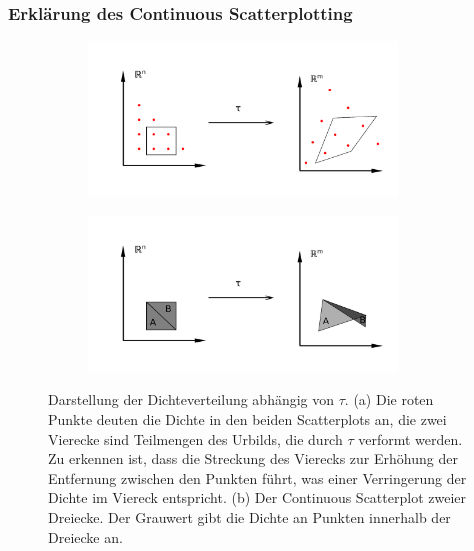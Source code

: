 \documentclass[a4paper,fontsize=12pt,toc=bib,parskip=half,ngerman]{scrartcl}
\begin{document}
\subsubsection{Erkl\"arung des Continuous Scatterplotting}
\begin{figure}
	\centering
	\begin{subfigure}{0.45\textwidth}
		\includegraphics[width=0.9\textwidth]{pictures/ContinuousScatterplot}
		\subcaption{}
	\end{subfigure}
	\begin{subfigure}{0.45\textwidth}
		\includegraphics[width=0.9\textwidth]{pictures/Case2}
		\subcaption{}
		\label{Case2}
	\end{subfigure}
	\caption{Darstellung der Dichteverteilung abh\"angig von $\tau$. (a) Die roten Punkte deuten die Dichte in den beiden Scatterplots an, die zwei Vierecke sind Teilmengen des Urbilds, die durch $\tau$ verformt werden. Zu erkennen ist, dass die Streckung des Vierecks zur Erh\"ohung der Entfernung zwischen den Punkten f\"uhrt, was einer Verringerung der Dichte im Viereck entspricht. (b) Der Continuous Scatterplot zweier Dreiecke. Der Grauwert gibt die Dichte an Punkten innerhalb der Dreiecke an.}
	\label{ContinuousScatterplot}
\end{figure}
\end{document}
